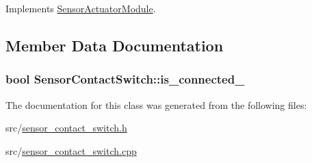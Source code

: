 Implements \hyperlink{class_sensor_actuator_module_adf93ff40fbdfeecbb8711ea0626fe6fc}{Sensor\+Actuator\+Module}.



\subsection{Member Data Documentation}
\hypertarget{class_sensor_contact_switch_a38d5bad22015b2013e776dec61bc8622}{}
\subsubsection[{is\+\_\+connected\+\_\+}]{\setlength{\rightskip}{0pt plus 5cm}bool Sensor\+Contact\+Switch\+::is\+\_\+connected\+\_\+}\label{class_sensor_contact_switch_a38d5bad22015b2013e776dec61bc8622}


The documentation for this class was generated from the following files\+:\begin{DoxyCompactItemize}
\item 
src/\hyperlink{sensor__contact__switch_8h}{sensor\+\_\+contact\+\_\+switch.\+h}\item 
src/\hyperlink{sensor__contact__switch_8cpp}{sensor\+\_\+contact\+\_\+switch.\+cpp}\end{DoxyCompactItemize}
